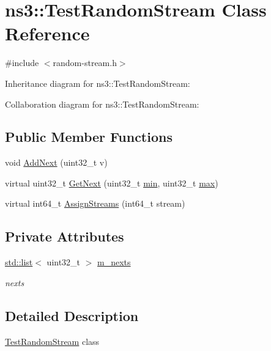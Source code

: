 \hypertarget{classns3_1_1TestRandomStream}{}\section{ns3\+:\+:Test\+Random\+Stream Class Reference}
\label{classns3_1_1TestRandomStream}


{\ttfamily \#include $<$random-\/stream.\+h$>$}



Inheritance diagram for ns3\+:\+:Test\+Random\+Stream\+:


Collaboration diagram for ns3\+:\+:Test\+Random\+Stream\+:
\subsection*{Public Member Functions}
\begin{DoxyCompactItemize}
\item 
void \hyperlink{classns3_1_1TestRandomStream_a26cfc79b61f5fd0e1280f394e468de07}{Add\+Next} (uint32\+\_\+t v)
\item 
virtual uint32\+\_\+t \hyperlink{classns3_1_1TestRandomStream_a79a43917cb6792d9e5cc4a9e26c1e456}{Get\+Next} (uint32\+\_\+t \hyperlink{80211b_8c_ac6afabdc09a49a433ee19d8a9486056d}{min}, uint32\+\_\+t \hyperlink{80211b_8c_affe776513b24d84b39af8ab0930fef7f}{max})
\item 
virtual int64\+\_\+t \hyperlink{classns3_1_1TestRandomStream_afa18960407b9fd6fe7cef18dc742e894}{Assign\+Streams} (int64\+\_\+t stream)
\end{DoxyCompactItemize}
\subsection*{Private Attributes}
\begin{DoxyCompactItemize}
\item 
\hyperlink{openflow-interface_8h_afd9bcfa176617760671b67580f536fa7}{std\+::list}$<$ uint32\+\_\+t $>$ \hyperlink{classns3_1_1TestRandomStream_a90c05d109ad34de296bff0662bfd75fe}{m\+\_\+nexts}
\begin{DoxyCompactList}\small\item\em nexts \end{DoxyCompactList}\end{DoxyCompactItemize}


\subsection{Detailed Description}
\hyperlink{classns3_1_1TestRandomStream}{Test\+Random\+Stream} class 

